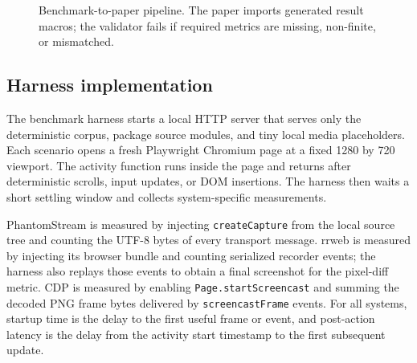 \documentclass[conference]{IEEEtran}
\newcommand{\code}[1]{\texttt{\small #1}}
\begin{document}
\begin{figure}[t]
\centering
{}
\caption{Benchmark-to-paper pipeline. The paper imports generated result macros;
the validator fails if required metrics are missing, non-finite, or mismatched.}
\label{fig:benchpipe}
\end{figure}

\subsection{Harness implementation}

The benchmark harness starts a local HTTP server that serves only the deterministic
corpus, package source modules, and tiny local media placeholders. Each scenario
opens a fresh Playwright Chromium page at a fixed 1280 by 720 viewport. The
activity function runs inside the page and returns after deterministic scrolls,
input updates, or DOM insertions. The harness then waits a short settling window
and collects system-specific measurements.

PhantomStream is measured by injecting \code{createCapture} from the local source
tree and counting the UTF-8 bytes of every transport message. rrweb is measured
by injecting its browser bundle and counting serialized recorder events; the
harness also replays those events to obtain a final screenshot for the pixel-diff
metric. CDP is measured by enabling \code{Page.startScreencast} and summing the
decoded PNG frame bytes delivered by \code{screencastFrame} events. For all
systems, startup time is the delay to the first useful frame or event, and
post-action latency is the delay from the activity start timestamp to the first
subsequent update.
\end{document}
